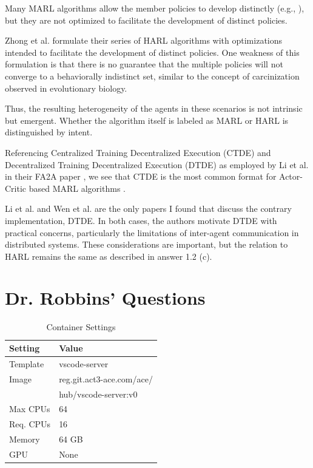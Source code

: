 \documentclass[12pt,letterpaper]{exam}
\begin{document}
\begin{questions}
\begin{parts}
		Many MARL algorithms allow the member policies to develop distinctly 
		(e.g., \cite{foerster2017, rashid2018, lowe2020}), but they are 
		not optimized to facilitate the development of distinct policies.

		Zhong et al. \cite{zhong2024} formulate their series of HARL 
		algorithms with optimizations intended to facilitate the development 
		of distinct policies. One weakness of this formulation is that there 
		is no guarantee that the multiple policies will not converge to a 
		behaviorally indistinct set, similar to the concept of 
		carcinization observed in evolutionary biology.

		Thus, the resulting heterogeneity of the agents in these scenarios 
		is not intrinsic but emergent. Whether the algorithm itself is 
		labeled as MARL or HARL is distinguished by intent.
	\end{parts}

	\question
	Referencing Centralized Training Decentralized Execution (CTDE) 
	and Decentralized Training Decentralized Execution (DTDE) as employed 
	by Li et al. in their FA2A paper \cite{li2023d}, we see that CTDE is 
	the most common format for Actor-Critic based MARL algorithms 
	\cite{foerster2017, rashid2018, lowe2020, li2023d, zhou2023}.

	Li et al. \cite{li2023d} and Wen et al. \cite{wen2021} are the only 
	papers I found that discuss the contrary implementation, DTDE. 
	In both cases, the authors motivate DTDE with practical concerns, 
	particularly the limitations of inter-agent communication in 
	distributed systems. These considerations are important, but the 
	relation to HARL remains the same as described in answer 1.2 (c).
\end{questions}


\clearpage
\section{Dr. Robbins' Questions}

\begin{table}
	\centering
	\vspace*{-1em}
	\begin{tabular}{ll}
		Setting & Value \\
		\midrule
		Template & vscode-server \\
		Image & reg.git.act3-ace.com/ace/ \\
			& hub/vscode-server:v0 \\
		Max CPUs & 64\\
		Req. CPUs & 16 \\
		Memory & 64 GB \\
		GPU & None \\
		\bottomrule
	\end{tabular}
	\caption{Container Settings}
	\label{tab:vm_specs}
	\vspace*{-1em}
\end{table}
\end{document}
